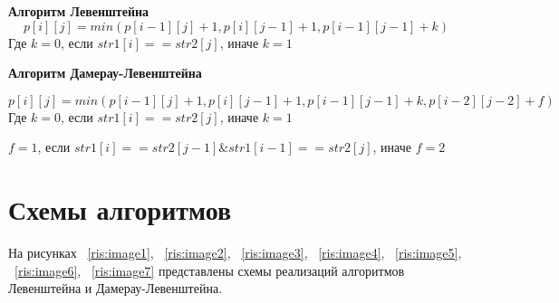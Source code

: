 \documentclass[12pt]{report}
\begin{document}
    {\bf Алгоритм Левенштейна}
    \begin{equation}
    p[i][j] = min(p[i-1][j] + 1, p[i][j-1] + 1, p[i-1][j-1]+k)
    \end{equation}
    Где $k = 0$, если $str1[i] == str2[j]$, иначе $k = 1$
    
    
    {\bf Алгоритм Дамерау-Левенштейна}
    
    \begin{equation}
    p[i][j] = min(p[i-1][j] + 1, p[i][j-1] + 1, p[i-1][j-1]+k, p[i-2][j-2] + f)
    \end{equation}
    Где $k = 0$, если $str1[i] == str2[j]$, иначе $k = 1$
    
    $f = 1$, если $str1[i] == str2[j-1] \& str1[i-1] == str2[j]$, иначе $f = 2$
    \vspace{0.5cm}
    
    
   \section{Схемы алгоритмов}
   \newpage
   На рисунках ~\ref{ris:image1}, ~\ref{ris:image2}, ~\ref{ris:image3}, ~\ref{ris:image4}, ~\ref{ris:image5}, ~\ref{ris:image6}, ~\ref{ris:image7} представлены схемы реализаций алгоритмов Левенштейна и Дамерау-Левенштейна.
   
\end{document}
